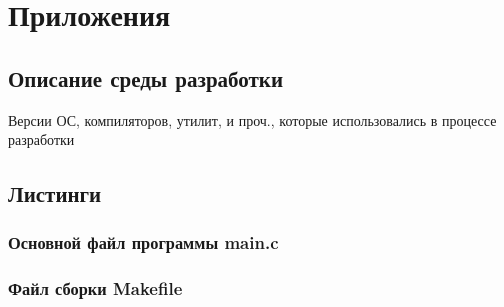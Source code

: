 \documentclass[12pt,a4paper]{report}
\begin{document}
\chapter*{Приложения}
\section*{Описание среды разработки}
Версии ОС, компиляторов, утилит, и проч., которые использовались в процессе разработки
\section*{Листинги}
\subsection*{Основной файл программы main.c}

\subsection*{Файл сборки Makefile}

\end{document}
